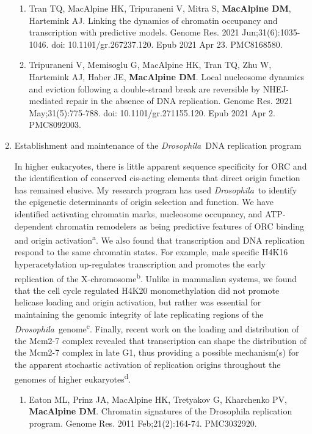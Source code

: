 \documentclass{nihbiosketch}
\newcommand\dros{{\itshape Drosophila}\xspace}
\begin{document}
\begin{enumerate}
\begin{enumerate}
\item Tran TQ, MacAlpine HK, Tripuraneni V, Mitra S, \textbf{MacAlpine DM}, Hartemink AJ. Linking the dynamics of chromatin occupancy and transcription with predictive models. Genome Res. 2021 Jun;31(6):1035-1046. doi: 10.1101/gr.267237.120. Epub 2021 Apr 23. PMC8168580.

\item Tripuraneni V, Memisoglu G, MacAlpine HK, Tran TQ, Zhu W, Hartemink AJ, Haber JE, \textbf{MacAlpine DM}. Local nucleosome dynamics and eviction following a double-strand break are reversible by NHEJ-mediated repair in the absence of DNA replication. Genome Res. 2021 May;31(5):775-788. doi: 10.1101/gr.271155.120. Epub 2021 Apr 2. PMC8092003.

\end{enumerate}


\item Establishment and maintenance of the \dros\ DNA replication program

In higher eukaryotes, there is little apparent sequence specificity for ORC and the identification of conserved cis-acting elements that direct origin function has remained elusive.  My research program has used \dros\ to identify the epigenetic determinants of origin selection and function. We have identified activating chromatin marks, nucleosome occupancy, and ATP-dependent chromatin remodelers as being predictive features of ORC binding and origin activation\textsuperscript{a}. We also found that transcription and DNA replication respond to the same chromatin states.  For example, male specific H4K16 hyperacetylation up-regulates transcription and promotes the early replication of the X-chromosome\textsuperscript{b}.  Unlike in mammalian systems, we found that the cell cycle regulated H4K20 monomethylation did not promote helicase loading and origin activation, but rather was essential for maintaining the genomic integrity of late replicating regions of the \dros\ genome\textsuperscript{c}.  Finally, recent work on the loading and distribution of the Mcm2-7 complex revealed that transcription can shape the distribution of the Mcm2-7 complex in late G1, thus providing a possible mechanism(s) for the apparent stochastic activation of replication origins throughout the genomes of higher eukaryotes\textsuperscript{d}.


\begin{enumerate}
\setlength\itemsep{0.35em}

\item Eaton ML, Prinz JA, MacAlpine HK, Tretyakov G, Kharchenko PV, \textbf{MacAlpine DM}. Chromatin signatures of the Drosophila replication program. Genome Res. 2011 Feb;21(2):164-74. PMC3032920.


\end{enumerate}
\end{enumerate}
\end{document}
